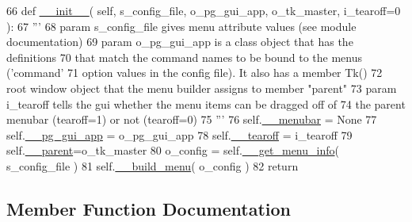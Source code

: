 \begin{DoxyCode}
66     \textcolor{keyword}{def }\hyperlink{classnegui_1_1pgmenubuilder_1_1PGMenuBuilder_a8e612e54bfe556d763a7150d8d8cbec5}{\_\_init\_\_}( self, s\_config\_file, o\_pg\_gui\_app,  o\_tk\_master, i\_tearoff=0 ):
67         \textcolor{stringliteral}{'''}
68 \textcolor{stringliteral}{        param s\_config\_file gives menu attribute values (see module documentation)}
69 \textcolor{stringliteral}{        param o\_pg\_gui\_app is a class object that has the definitions}
70 \textcolor{stringliteral}{                that match the command names to be bound to the menus ('command' }
71 \textcolor{stringliteral}{                option values in the config file). It also has a member Tk()}
72 \textcolor{stringliteral}{                root window object that the menu builder assigns to member "parent"}
73 \textcolor{stringliteral}{        param i\_tearoff tells the gui whether the menu items can be dragged off of }
74 \textcolor{stringliteral}{            the parent menubar (tearoff=1) or not (tearoff=0)}
75 \textcolor{stringliteral}{        '''}
76         self.\hyperlink{classnegui_1_1pgmenubuilder_1_1PGMenuBuilder_ae68d0c5a32a42f23fae44d177125e639}{\_\_menubar} = \textcolor{keywordtype}{None}
77         self.\hyperlink{classnegui_1_1pgmenubuilder_1_1PGMenuBuilder_af0a1a02f4ae4cb51ddcae82ff1bda3b8}{\_\_pg\_gui\_app} = o\_pg\_gui\_app
78         self.\hyperlink{classnegui_1_1pgmenubuilder_1_1PGMenuBuilder_aa1c29f9898f4129fa7a8c3fa52498322}{\_\_tearoff} = i\_tearoff
79         self.\hyperlink{classnegui_1_1pgmenubuilder_1_1PGMenuBuilder_a96fdfb4d4b5bfc2cb502ca5c513f4326}{\_\_parent}=o\_tk\_master
80         o\_config = self.\hyperlink{classnegui_1_1pgmenubuilder_1_1PGMenuBuilder_af9e8faf1c4c173851774fb37f0900a2c}{\_\_get\_menu\_info}( s\_config\_file )
81         self.\hyperlink{classnegui_1_1pgmenubuilder_1_1PGMenuBuilder_a308e619e77dc646c8668bbced4171394}{\_\_build\_menu}( o\_config )
82         \textcolor{keywordflow}{return}
\end{DoxyCode}


\subsection{Member Function Documentation}
